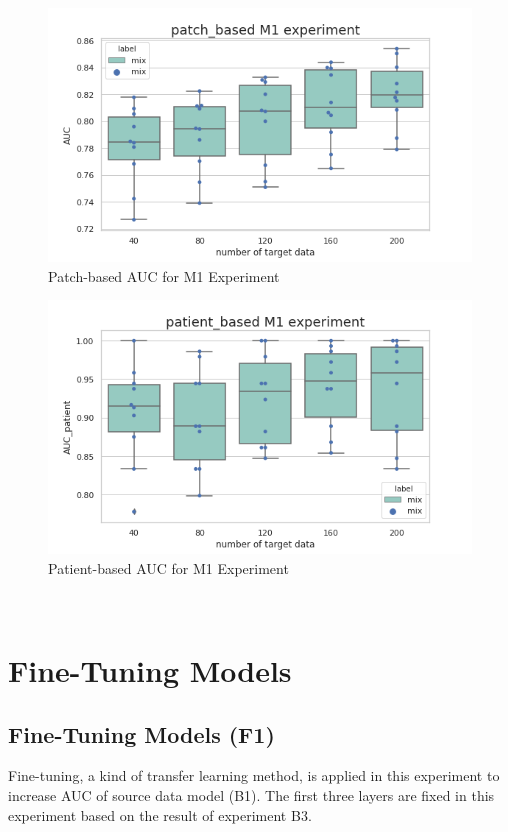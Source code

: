 \begin{figure}[H]
    \hfil
    \begin{minipage}[t]{0.9\textwidth}
        \includegraphics[width=\textwidth]{fig/M1_num_patch.png}
        \caption{\label{fig:parallel1}Patch-based AUC for M1 Experiment}
    \end{minipage}
    \hfil
\end{figure}
\begin{figure}[H]
    \hfil
    \begin{minipage}[t]{0.9\textwidth}
        \includegraphics[width=\textwidth]{fig/M1_num_patient.png}
        \caption{\label{fig:parallel1}Patient-based AUC for M1 Experiment}
    \end{minipage}
    \hfil
\end{figure}
~\\
\section{Fine-Tuning Models}
\subsection{Fine-Tuning Models (F1)}
Fine-tuning, a kind of transfer learning method, is applied in this experiment to increase AUC of source data model (B1). The first three layers are fixed in this experiment based on the result of experiment B3.


